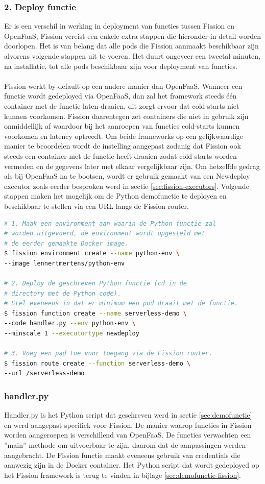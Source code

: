 \subsubsection{2. Deploy functie}
Er is een verschil in werking in deployment van functies tussen Fission en OpenFaaS, Fission vereist een enkele extra stappen die hieronder in detail worden doorlopen. Het is van belang dat alle pods die Fission aanmaakt beschikbaar zijn alvorens volgende stappen uit te voeren. Het duurt ongeveer een tweetal minuten, na installatie, tot alle pods beschikbaar zijn voor deployment van functies.
\\\\
Fission werkt by-default op een andere manier dan OpenFaaS. Wanneer een functie wordt gedeployed via OpenFaaS, dan zal het framework steeds één container met de functie laten draaien, dit zorgt ervoor dat cold-starts niet kunnen voorkomen. Fission daarentegen zet containers die niet in gebruik zijn onmiddellijk af waardoor bij het aanroepen van functies cold-starts kunnen voorkomen en latency optreedt. Om beide frameworks op een gelijkwaardige manier te beoordelen wordt de instelling aangepast zodanig dat Fission ook steeds een container met de functie heeft draaien zodat cold-starts worden vermeden en de gegevens later met elkaar vergelijkbaar zijn. Om hetzelfde gedrag als bij OpenFaaS na te bootsen, wordt er gebruik gemaakt van een Newdeploy executor zoals eerder besproken werd in sectie \ref{sec:fission-executors}. Volgende stappen maken het mogelijk om de Python demofunctie te deployen en beschikbaar te stellen via een URL langs de Fission router.

\begin{lstlisting}[language=bash]
# 1. Maak een environment aan waarin de Python functie zal 
# worden uitgevoerd, de environment wordt opgesteld met 
# de eerder gemaakte Docker image.
$ fission environment create --name python-env \
--image lennertmertens/python-env

# 2. Deploy de geschreven Python functie (cd in de 
# directory met de Python code).
# Stel eveneens in dat er minimum een pod draait met de functie.
$ fission function create --name serverless-demo \
--code handler.py --env python-env \
--minscale 1 --executortype newdeploy

# 3. Voeg een pad toe voor toegang via de Fission router.
$ fission route create --function serverless-demo \
--url /serverless-demo
\end{lstlisting}
 
\subsubsection{handler.py}
Handler.py is het Python script dat geschreven werd in sectie \ref{sec:demofunctie} en werd aangepast specifiek voor Fission. De manier waarop functies in Fission worden aangeroepen is verschillend van OpenFaaS. De functies verwachten een ''main'' methode om uitvoerbaar te zijn, daarom dat de aanpassingen werden aangebracht. De Fission functie maakt eveneens gebruik van credentials die aanwezig zijn in de Docker container. Het Python script dat wordt gedeployed op het Fission framework is terug te vinden in bijlage \ref{sec:demofunctie-fission}.

